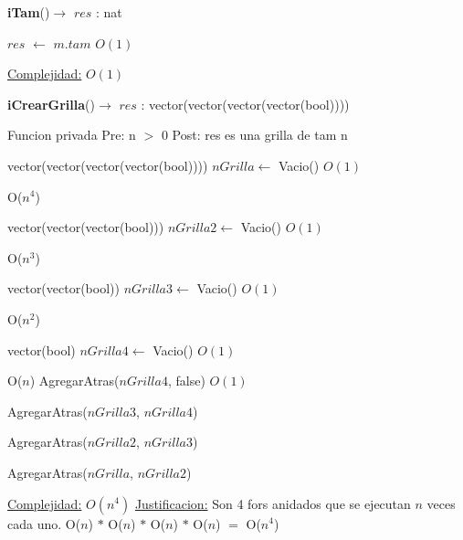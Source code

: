 \begin{Algoritmos}
\begin{algorithmic}[1]
\end{algorithmic}



\begin{algorithm}[H]
{\textbf{iTam}()$\to$ $res$ : nat}
\begin{algorithmic}[1]

\State $res$ $\gets$ $m$.$tam$ \Comment $O(1)$

\medskip
\Statex \underline{Complejidad:} $O(1)$

\end{algorithmic}
\end{algorithm}






\begin{algorithm}[H]
{\textbf{iCrearGrilla}()$\to$ $res$ : vector(vector(vector(vector(bool))))}
\begin{algorithmic}[1]

\Statex Funcion privada 
\Statex Pre: n $>$ 0 
\Statex Post: res es una grilla de tam n

\State vector(vector(vector(vector(bool)))) $nGrilla \gets$ Vacio() \Comment $O(1)$

   \Comment O($n^4$)

	\State vector(vector(vector(bool))) $nGrilla2 \gets$ Vacio()  \Comment $O(1)$
	
	  \Comment O($n^3$)
	
		\State vector(vector(bool)) $nGrilla3 \gets$ Vacio()   \Comment $O(1)$
		
		  \Comment O($n^2$)

			\State vector(bool) $nGrilla4 \gets$ Vacio() \Comment $O(1)$
			
			   \Comment O($n$)
			 	\State AgregarAtras($nGrilla4$, false) \Comment $O(1)$			 	
			 \EndFor		
			 
			 \State AgregarAtras($nGrilla3$, $nGrilla4$)
		
		\EndFor
		
		\State AgregarAtras($nGrilla2$, $nGrilla3$)
	
	\EndFor
	
	\State AgregarAtras($nGrilla$, $nGrilla2$)


\EndFor

\medskip
\Statex \underline{Complejidad:} $O(n^4)$
\Statex \underline{Justificacion:} Son 4 fors anidados que se ejecutan $n$ veces cada uno. O($n$) $*$ O($n$) $*$ O($n$) $*$ O($n$) $=$  O($n^4$)
 
\end{algorithmic}
\end{algorithm}



  
\end{Algoritmos}